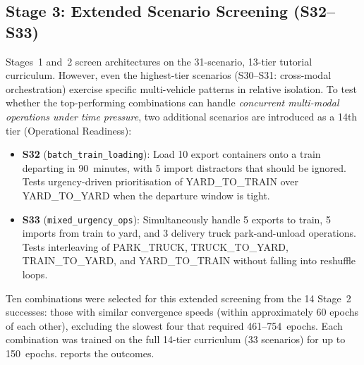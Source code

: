 \subsection{Stage 3: Extended Scenario Screening (S32--S33)}
\label{sec:res:phase1:stage3}

Stages~1 and~2 screen architectures on the 31-scenario, 13-tier tutorial curriculum. However, even the highest-tier scenarios (S30--S31: cross-modal orchestration) exercise specific multi-vehicle patterns in relative isolation. To test whether the top-performing combinations can handle \emph{concurrent multi-modal operations under time pressure}, two additional scenarios are introduced as a 14th tier (Operational Readiness):

\begin{itemize}
  \item \textbf{S32} (\texttt{batch\_train\_loading}): Load 10 export containers onto a train departing in 90~minutes, with 5 import distractors that should be ignored. Tests urgency-driven prioritisation of YARD\_TO\_TRAIN over YARD\_TO\_YARD when the departure window is tight.
  \item \textbf{S33} (\texttt{mixed\_urgency\_ops}): Simultaneously handle 5 exports to train, 5 imports from train to yard, and 3 delivery truck park-and-unload operations. Tests interleaving of PARK\_TRUCK, TRUCK\_TO\_YARD, TRAIN\_TO\_YARD, and YARD\_TO\_TRAIN without falling into reshuffle loops.
\end{itemize}

Ten combinations were selected for this extended screening from the 14 Stage~2 successes: those with similar convergence speeds (within approximately 60 epochs of each other), excluding the slowest four that required 461--754~epochs. Each combination was trained on the full 14-tier curriculum (33 scenarios) for up to 150~epochs.  reports the outcomes.

